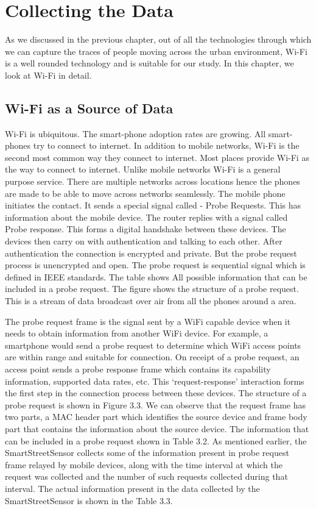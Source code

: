 \chapter{Collecting the Data}

As we discussed in the previous chapter, out of all the technologies through
which we can capture the traces of people moving across the urban environment,
Wi-Fi is a well rounded technology and is suitable for our study. In this
chapter, we look at Wi-Fi in detail.

\section{Wi-Fi as a Source of Data}

Wi-Fi is ubiquitous.
The smart-phone adoption rates are growing.
All smart-phones try to connect to internet.
In addition to mobile networks, Wi-Fi is the second most common way they connect to internet.
Most places provide Wi-Fi as the way to connect to internet.
Unlike mobile networks Wi-Fi is a general purpose service.
There are multiple networks across locations hence the phones are made to be able to move across networks seamlessly.
The mobile phone initiates the contact.
It sends a special signal called - Probe Requests.
This has information about the mobile device.
The router replies with a signal called Probe response.
This forms a digital handshake between these devices.
The devices then carry on with authentication and talking to each other.
After authentication the connection is encrypted and private.
But the probe request process is unencrypted and open.
The probe request is sequential signal which is defined in IEEE standards.
The table shows All possible information that can be included in a probe request.
The figure shows the structure of a probe request.
This is a stream of data broadcast over air from all the phones around a area. 

The probe request frame is the signal sent by a WiFi capable device when it needs to obtain information from another WiFi device.
For example, a smartphone would send a probe request to determine which WiFi access points are within range and suitable for connection.
On receipt of a probe request, an access point sends a probe response frame which contains its capability information, supported data rates, etc.
This ‘request-response’ interaction forms the first step in the connection process between these devices.
The structure of a probe request is shown in Figure 3.3.
We can observe that the request frame has two parts, a MAC header part which identifies the source device and frame body part that contains the information about the source device.
The information that can be included in a probe request shown in Table 3.2.
As mentioned earlier, the SmartStreetSensor collects some of the information present in probe request frame relayed by mobile devices, along with the time interval at which the request was collected and the number of such requests collected during that interval.
The actual information present in the data collected by the SmartStreetSensor is shown in the Table 3.3.

